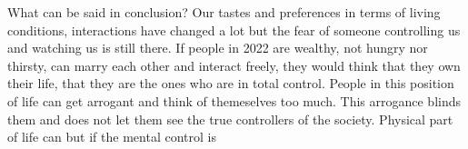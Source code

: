 \documentclass[a4paper,12pt]{article}
\begin{document}

What can be said in conclusion? Our tastes and preferences in terms of living conditions, interactions have changed a lot but the fear of someone controlling us and watching us is still there. If people in 2022 are wealthy, not hungry nor thirsty, can marry each other and interact freely, they would think that they own their life, that they are the ones who are in total control. People in this position of life can get arrogant and think of themeselves too much. This arrogance blinds them and does not let them see the true controllers of the society. Physical part of life can  but if the mental control is 


\newpage


\end{document}
